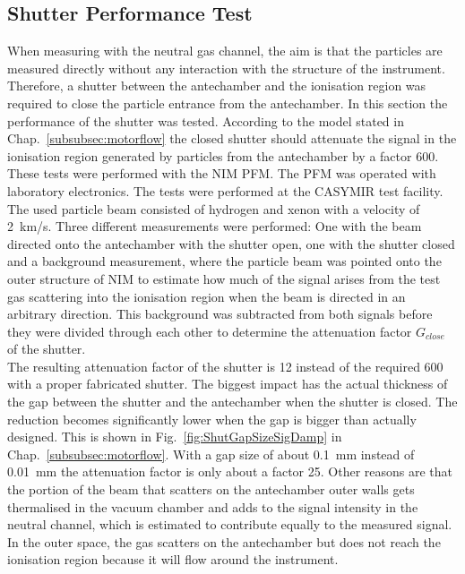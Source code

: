 	\subsection{Shutter Performance Test}\label{chap:expShutter}
	When measuring with the neutral gas channel, the aim is that the particles are measured directly without any interaction with the structure of the instrument. Therefore, a shutter between the antechamber and the ionisation region was required to close the particle entrance from the antechamber. In this section the performance of the shutter was tested. According to the model stated in Chap.~\ref{subsubsec:motorflow} the closed shutter should attenuate the signal in the ionisation region generated by particles from the antechamber by a factor 600.\\
	These tests were performed with the NIM PFM. The PFM was operated with laboratory electronics. The tests were performed at the CASYMIR test facility. The used particle beam consisted of hydrogen and xenon with a velocity of 2~km/s. Three different measurements were performed: One with the beam directed onto the antechamber with the shutter open, one with the shutter closed and a background measurement, where the particle beam was pointed onto the outer structure of NIM to estimate how much of the signal arises from the test gas scattering into the ionisation region when the beam is directed in an arbitrary direction. This background was subtracted from both signals before they were divided through each other to determine the attenuation factor $G_{close}$ of the shutter.\\
	The resulting attenuation factor of the shutter is 12 instead of the required 600 with a proper fabricated shutter. The biggest impact has the actual thickness of the gap between the shutter and the antechamber when the shutter is closed. The reduction becomes significantly lower when the gap is bigger than actually designed. This is shown in Fig.~\ref{fig:ShutGapSizeSigDamp} in Chap.~\ref{subsubsec:motorflow}. With a gap size of about 0.1~mm instead of 0.01~mm the attenuation factor is only about a factor 25. Other reasons are that the portion of the beam that scatters on the antechamber outer walls gets thermalised in the vacuum chamber and adds to the signal intensity in the neutral channel, which is estimated to contribute equally to the measured signal. In the outer space, the gas scatters on the antechamber but does not reach the ionisation region because it will flow around the instrument.
	

